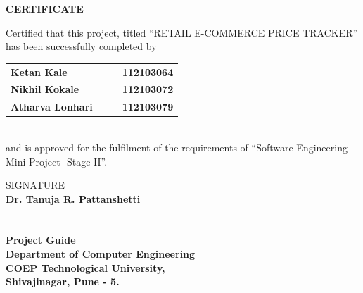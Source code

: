 \documentclass[a4paper,14pt,onecolumn]{report}
\begin{document}
	\vspace{20pt}			%
	
	\begin{center}
		\Large{\bf{CERTIFICATE\\}}
	\end{center}
	
	\vspace{20pt}
	
	\linespread{2}			%
	\selectfont
	\large{
		Certified that this project, titled ``RETAIL E-COMMERCE PRICE TRACKER''
		has been successfully completed by \\ 
		\begin{table}[htbp]
			\begin{center}
				\begin{tabular}{ l c c l }
					\Large\bf{Ketan Kale} & & & \Large\bf{112103064} \\
					\Large\bf{Nikhil Kokale} & & & \Large\bf{112103072} \\
					\Large\bf{Atharva Lonhari} & & & \Large\bf{112103079} \\[0.3cm]
					
				\end{tabular}
			\end{center}
		\end{table} \\
		and is approved for the fulfilment of the requirements of 
		``Software Engineering Mini Project- Stage II''.
	}
	
	\vspace{100pt}
	
	\begin{center}		%
		
		SIGNATURE\\
		\normalsize{\bf{\Large{\bf{Dr. Tanuja R. Pattanshetti \\ }\\}\\
				Project Guide}\\
			Department of Computer Engineering\\
			COEP Technological University,\\
			Shivajinagar, Pune - 5.}
	\end{center}
	
\end{document}

